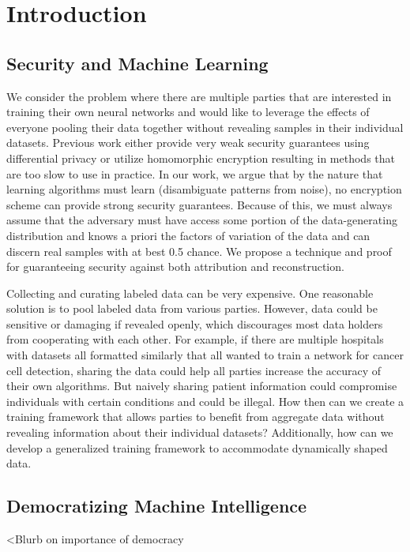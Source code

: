 \chapter{Introduction}
\label{chapter:Introduction}
\thispagestyle{myheadings}

\section{Security and Machine Learning}
\label{sec:history}

We consider the problem where there are multiple parties that are interested in training their own neural networks and would like to leverage the effects of everyone pooling their data together without revealing samples in their individual datasets. Previous work either provide very weak security guarantees using differential privacy or utilize homomorphic encryption resulting in methods that are too slow to use in practice. In our work, we argue that by the nature that learning algorithms must learn (disambiguate patterns from noise), no encryption scheme can provide strong security guarantees. Because of this, we must always assume that the adversary must have access some portion of the data-generating distribution and knows a priori the factors of variation of the data and can discern real samples with at best 0.5 chance. We propose a technique and proof for guaranteeing security against both attribution and reconstruction.

Collecting and curating labeled data can be very expensive. One reasonable solution is to pool labeled data from various parties. However, data could be sensitive or damaging if revealed openly, which discourages most data holders from cooperating with each other. For example, if there are multiple hospitals with datasets all formatted similarly that all wanted to train a network for cancer cell detection, sharing the data could help all parties increase the accuracy of their own algorithms. But naively sharing patient information could compromise individuals with certain conditions and could be illegal. How then can we create a training framework that allows parties to benefit from aggregate data without revealing information about their individual datasets? Additionally, how can we develop a generalized training framework to accommodate dynamically shaped data.

\section{Democratizing Machine Intelligence}
<Blurb on importance of democracy 